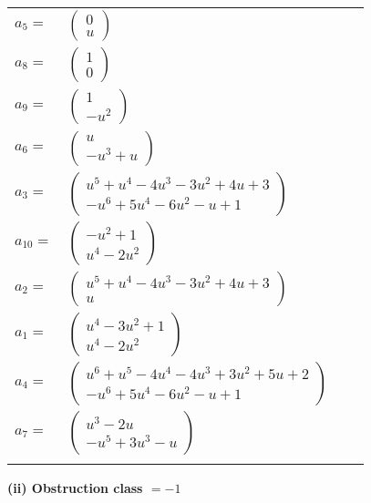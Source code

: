\documentclass[1p]{elsarticle_modified}
\theoremstyle{definition}
\begin{document}
\begin{tabular}{m{7pt} m{180pt} m{7pt} m{180pt} }
\flushright $a_{5}=$&$\begin{pmatrix}0\\u\end{pmatrix}$ \\
\flushright $a_{8}=$&$\begin{pmatrix}1\\0\end{pmatrix}$ \\
\flushright $a_{9}=$&$\begin{pmatrix}1\\- u^2\end{pmatrix}$ \\
\flushright $a_{6}=$&$\begin{pmatrix}u\\- u^3+u\end{pmatrix}$ \\
\flushright $a_{3}=$&$\begin{pmatrix}u^5+u^4-4 u^3-3 u^2+4 u+3\\- u^6+5 u^4-6 u^2- u+1\end{pmatrix}$ \\
\flushright $a_{10}=$&$\begin{pmatrix}- u^2+1\\u^4-2 u^2\end{pmatrix}$ \\
\flushright $a_{2}=$&$\begin{pmatrix}u^5+u^4-4 u^3-3 u^2+4 u+3\\u\end{pmatrix}$ \\
\flushright $a_{1}=$&$\begin{pmatrix}u^4-3 u^2+1\\u^4-2 u^2\end{pmatrix}$ \\
\flushright $a_{4}=$&$\begin{pmatrix}u^6+u^5-4 u^4-4 u^3+3 u^2+5 u+2\\- u^6+5 u^4-6 u^2- u+1\end{pmatrix}$ \\
\flushright $a_{7}=$&$\begin{pmatrix}u^3-2 u\\- u^5+3 u^3- u\end{pmatrix}$\\&\end{tabular}
\flushleft \textbf{(ii) Obstruction class $= -1$}\\~\\
\end{document}
